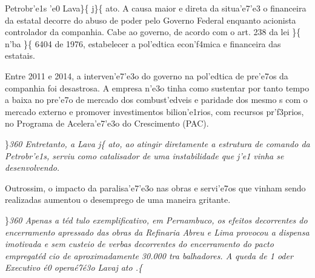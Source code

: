Petrobr'e1s 'e0 Lava\}\{\rtlch{}  \ltrch{} 
j\}\{\rtlch{}  \ltrch{}  ato.
A causa maior e direta da situa'e7'e3 o financeira da estatal decorre do
abuso de poder pelo Governo Federal enquanto acionista controlador da
companhia. Cabe ao governo, de acordo com o art. 238 da lei
\}\{\rtlch{}  \ltrch{}  n'ba \}\{\rtlch{}
 \ltrch{}  6404 de 1976,
estabelecer a pol'edtica econ'f4mica e financeira das estatais.
\par \tab Entre 2011 e 2014, a interven'e7'e3o do governo na pol'edtica
de pre'e7os da companhia foi desastrosa. A empresa n'e3o tinha como
sustentar por tanto tempo a baixa no pre'e7o de mercado dos
combust'edveis e paridade dos mesmo s com o mercado externo e promover
investimentos bilion'e1rios, com recursos pr'f3prios, no Programa de
Acelera'e7'e3o do Crescimento (PAC).
\par \}\pard \ltrpar\qj {}\sl360\widctlpar\wrapdefault\faauto{} {\rtlch{}  \ltrch{}  Entretanto, a Lava}{\rtlch{}  \ltrch{}  j}\{\rtlch{}
 \ltrch{}  ato, ao atingir
diretamente a estrutura de comando da Petrobr'e1s, serviu como
catalisador de uma instabilidade que j'e1 vinha se desenvolvendo.
\par Outrossim, o impacto da paralisa'e7'e3o nas obras e servi'e7os que
vinham sendo realizadas aumentou o desemprego de uma maneira gritante.
\par \}\pard \ltrpar\qj {}\sl360\widctlpar\wrapdefault\faauto{} {\rtlch{}  \ltrch{}  Apenas a t\'ed
tulo exemplificativo, em Pernambuco, os efeitos decorrentes do encerramento apressado das obras da Refinaria Abreu e Lima provocou a dispensa imotivada e sem custeio de verbas decorrentes do encerramento do pacto empregat\'ed
cio de aproximadamente 30.000 tra}{\rtlch{}  \ltrch{}  balhadores. }{\rtlch{}  \ltrch{}  A queda de 1%
 oder Executivo \'e0 opera\'e7\'e3o Lavaj}{\rtlch{}  \ltrch{}  ato}{\rtlch{}  \ltrch{}  .}\{\rtlch{}
 \ltrch{} \\
